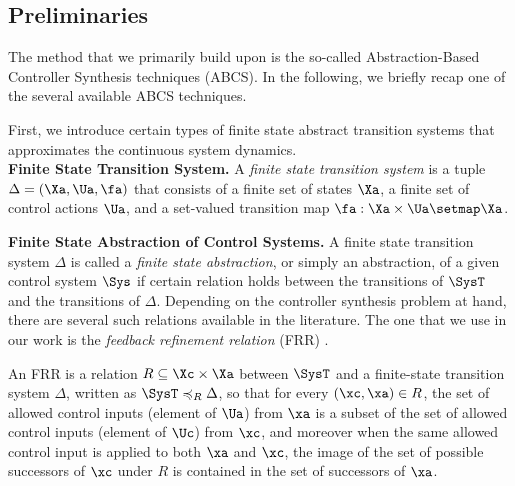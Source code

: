 \subsection{Preliminaries}\label{sec:prelims_abcs}

The method that we primarily build upon is the so-called Abstraction-Based Controller Synthesis techniques (ABCS).
In the following, we briefly recap one of the several available ABCS techniques.

First, we introduce certain types of finite state abstract transition systems that approximates the continuous system dynamics.\\
\noindent\textbf{Finite State Transition System.}
A \emph{finite state transition system} is a tuple $\Delta= (\Xa, \Ua, \fa)$ that consists of a finite set of states $\Xa$, a finite set of control actions $\Ua$, and a set-valued transition map $\fa:\Xa\times \Ua\setmap \Xa$.

\smallskip
\noindent\textbf{Finite State Abstraction of Control Systems.}
A finite state transition system $\Delta$ is called a \emph{finite state abstraction}, or simply an abstraction, of a given control system $\Sys$ if certain relation holds between the transitions of $\SysT$ and the transitions of $\Delta$.
Depending on the controller synthesis problem at hand, there are several such relations available in the literature. %
The one that we use in our work is the \emph{feedback refinement relation} (FRR) \cite{ReissigWeberRungger_2017_FRR}.

An FRR is a relation $R\subseteq \Xc\times \Xa$ between $\SysT$ and a finite-state transition system $\Delta$, written as $\SysT \preccurlyeq_R \Delta$, so that for every $(\xc,\xa)\in R$, the set of allowed control inputs (element of $\Ua$) from $\xa$ is a subset of the set of allowed control inputs (element of $\Uc$) from $\xc$, and moreover when the same allowed control input is applied to both $\xa$ and $\xc$, the image of the set of possible successors of $\xc$ under $R$ is contained in the set of successors of $\xa$.


